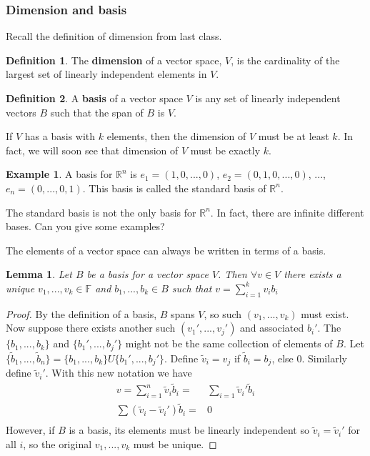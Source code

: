 \documentclass[12pt,reqno]{amsart}
\def\F{\mathbb{F}}
\def\R{\mathbb{R}}
\newtheorem{lemma}{Lemma}[section]
\theoremstyle{definition}
\newtheorem{definition}{Definition}[section]
\newtheorem{example}{Example}[section]
\begin{document}
\subsubsection{Dimension and basis}
Recall the definition of dimension from last class. 
\begin{definition}
  The \textbf{dimension} of a vector space, $V$, is the cardinality of
  the largest set of linearly independent elements in $V$.
\end{definition} 

\begin{definition}
  A \textbf{basis} of a vector space $V$ is any set of linearly
  independent vectors $B$ such that the span of $B$ is $V$.
\end{definition}
If $V$ has a basis with $k$ elements, then the dimension of $V$ must
be at least $k$. In fact, we will soon see that dimension of $V$ must
be exactly $k$.
\begin{example}
  A basis for $\R^n$ is $e_1 = (1, 0, ..., 0 )$, $e_2 = (0, 1, 0, ...,
  0)$, $...$, $e_n = (0, ... , 0 , 1)$. This basis is called the
  standard basis of $\R^n$. 

  The standard basis is not the only basis for $\R^n$. In fact, there
  are infinite different bases. Can you give some examples?
\end{example}
The elements of a vector space can always be written in terms of a
basis. 
\begin{lemma} \label{lem:uniqueRep}
  Let $B$ be a basis for a vector space $V$. Then
  $\forall v \in V$ there exists a unique $v_1, ..., v_k \in \F$ and
  $b_1, ..., b_k \in B$
  such that $ v = \sum_{i=1}^k v_i b_i$  
\end{lemma}
\begin{proof}
  By the definition of a basis, $B$ spans $V$, so such
  $(v_1, ..., v_k)$ must exist. Now suppose there exists another such
  $(v_1', ..., v_j')$ and associated $b_i'$. The $\{b_1, ..., b_k\}$ and
  $\{b_1', ..., b_j'\}$ might not be the same collection of elements
  of $B$. Let $\{\tilde{b}_1, ..., \tilde{b}_n \} =  \{b_1, ...,
  b_k\} U \{b_1', ..., b_j'\}$. Define $\tilde{v}_i = v_j$ if
  $\tilde{b}_i = b_j$, else $0$. Similarly define $\tilde{v}_i'$. With
  this new notation we have
  \begin{align*}
    v = \sum_{i=1}^n \tilde{v}_i \tilde{b}_i = & \sum_{i=1} \tilde{v}_i' \tilde{b}_i \\
    \sum (\tilde{v}_i - \tilde{v}_i')\tilde{b}_i = & 0 \\
  \end{align*}
  However, if $B$ is a basis, its elements must be linearly
  independent so $\tilde{v}_i = \tilde{v}_i'$ for all $i$, so the
  original $v_1, ..., v_k$ must be unique.
\end{proof}
\end{document}
